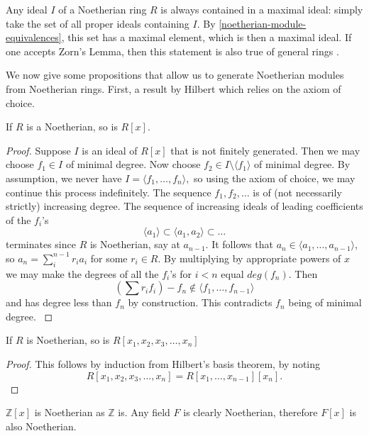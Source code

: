 \begin{remark}
Any ideal $I$ of a Noetherian ring $R$ is always contained in a maximal ideal: simply take the set of all proper ideals containing $I$. By \cref{noetherian-module-equivalences}, this set has a maximal element, which is then a maximal ideal. If one accepts Zorn's Lemma, then this statement is also true of general rings \cite{Wright}.
\end{remark}

We now give some propositions that allow us to generate Noetherian modules from Noetherian rings. First, a result by Hilbert which relies on the axiom of choice.

\begin{theorem}\label{Hilbert-basis-theorem}
If $R$ is a Noetherian, so is $R[x]$.
\end{theorem}
\begin{proof}
Suppose $I$ is an ideal of $R[x]$ that is not finitely generated. Then we may choose $f_1\in I$ of minimal degree. Now choose $f_2\in I\setminus \langle f_1 \rangle$ of minimal degree. By assumption, we never have $I=\langle f_1,\dots,f_n\rangle,$ so using the axiom of choice, we may continue this process indefinitely. The sequence $f_1,f_2,\dots$ is of (not necessarily strictly) increasing degree. The sequence of increasing ideals of leading coefficients of the $f_i$'s 
$$\langle a_1\rangle\subset \langle a_1,a_2\rangle \subset \dots$$
terminates since $R$ is Noetherian, say at $a_{n-1}$. It follows that $a_n\in \langle a_1,\dots,a_{n-1}\rangle$, so $a_n=\sum_i^{n-1} r_ia_i$ for some $r_i\in R$. By multiplying by appropriate powers of $x$ we may make the degrees of all the $f_i$'s for $i<n$ equal $deg(f_n)$. Then $$(\sum r_if_i)-f_n\not \in \langle f_1,\dots,f_{n-1}\rangle$$ and has degree less than $f_n$ by construction. This contradicts $f_n$ being of minimal degree. \cite{Hilbert}
\end{proof}

\begin{corollary}
If $R$ is Noetherian, so is $R[x_1,x_2,x_3,\dots,x_n]$
\end{corollary}
\begin{proof}
This follows by induction from Hilbert's basis theorem, by noting $$R[x_1,x_2,x_3,\dots,x_n]=R[x_1,\dots,x_{n-1}][x_n].$$
\end{proof}


\begin{example}
$\mathbb{Z}[x]$ is Noetherian as $\mathbb{Z}$ is. Any field $F$ is clearly Noetherian, therefore $F[x]$ is also Noetherian.
\end{example}

